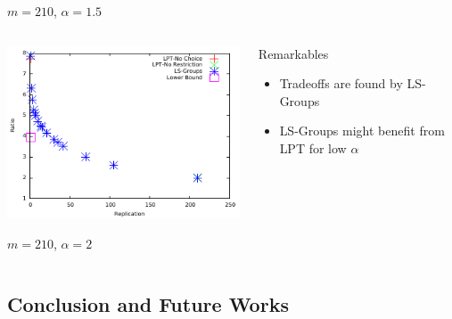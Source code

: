 \documentclass[usenames,dvipsnames]{beamer}
\begin{document}
\begin{frame}
\begin{columns}
\begin{center}
      {\footnotesize $m=210$, $\alpha=1.5$}
    \end{center}
    
  \end{columns}

  \vspace{-1.1em}

  \begin{columns}
    
    \begin{center}
      \includegraphics[width=\textwidth]{figs/alpha_2.pdf}
  
      {\footnotesize $m=210$, $\alpha=2$}
    \end{center}

    \begin{block}{Remarkables}
      \begin{itemize}
      \item Tradeoffs are found by LS-Groups
      \item LS-Groups might benefit from LPT for low $\alpha$
      \end{itemize}
    \end{block}
  \end{columns}
  
\end{frame}

\subsection{Conclusion and Future Works}
\end{document}
